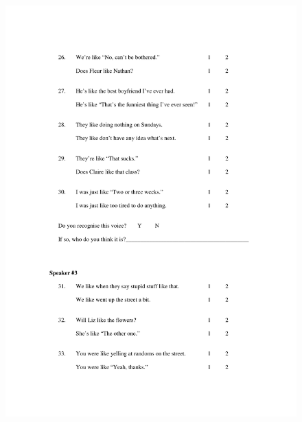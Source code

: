 \begin{figure}
	\centering
		\includegraphics[width=5in]{images/Exp2page4.pdf}
			\label{x2p4}
\end{figure}

